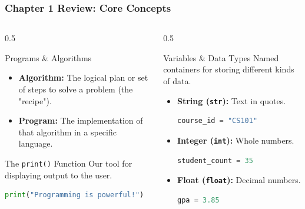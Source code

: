 \documentclass{beamer}
\begin{document}
\begin{frame}[fragile]
    \frametitle{Chapter 1 Review: Core Concepts}
    
    \begin{columns}[T]
        \begin{column}{0.5\textwidth}
            \begin{block}{Programs \& Algorithms}
                \begin{itemize}
                    \item \textbf{Algorithm:} The logical plan or set of steps to solve a problem (the "recipe").
                    \item \textbf{Program:} The implementation of that algorithm in a specific language.
                \end{itemize}
            \end{block}
            
            \begin{block}{The \texttt{print()} Function}
                Our tool for displaying output to the user.
\begin{lstlisting}[language=Python]
print("Programming is powerful!")
\end{lstlisting}
            \end{block}
        \end{column}
        
        \begin{column}{0.5\textwidth}
            \begin{block}{Variables \& Data Types}
                Named containers for storing different kinds of data.
                \begin{itemize}
                    \item \textbf{String (\texttt{str}):} Text in quotes.
                    \begin{lstlisting}[language=Python]
course_id = "CS101"
                    \end{lstlisting}
                    \item \textbf{Integer (\texttt{int}):} Whole numbers.
                    \begin{lstlisting}[language=Python]
student_count = 35
                    \end{lstlisting}
                    \item \textbf{Float (\texttt{float}):} Decimal numbers.
                    \begin{lstlisting}[language=Python]
gpa = 3.85
                    \end{lstlisting}
                \end{itemize}
            \end{block}
        \end{column}
    \end{columns}
    
\end{frame}
\end{document}
